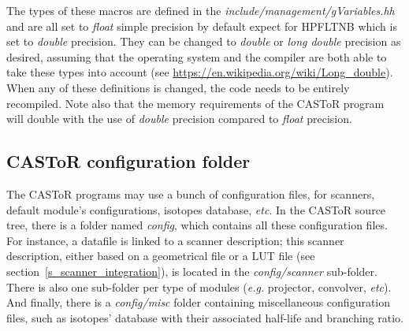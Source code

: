\documentclass[a4paper, 11pt]{article}
\begin{document}
The types of these macros are defined in the \textit{include/management/gVariables.hh} and are all set to \textit{float} simple precision by default expect for HPFLTNB which is set to \textit{double} precision.
They can be changed to \textit{double} or \textit{long double} precision as desired, assuming that the operating system and the compiler are both able
to take these types into account (see \url{https://en.wikipedia.org/wiki/Long\_double}).
When any of these definitions is changed, the code needs to be entirely recompiled.
Note also that the memory requirements of the CASToR program will double with the use of \textit{double} precision compared to \textit{float} precision.

\subsection{CASToR configuration folder}
\label{ss_install_config}

The CASToR programs may use a bunch of configuration files, for scanners, default module's configurations, isotopes database, \textit{etc}. In the CASToR source
tree, there is a folder named \textit{config}, which contains all these configuration files. For instance, a datafile is linked to a scanner description;
this scanner description, either based on a geometrical file or a LUT file (see section~\ref{s_scanner_integration}), is located in the
\textit{config/scanner} sub-folder. There is also one sub-folder per type of modules (\textit{e.g.} projector, convolver, \textit{etc}). And finally, there is a
\textit{config/misc} folder containing miscellaneous configuration files, such as isotopes' database with their associated half-life and branching ratio.
\end{document}
